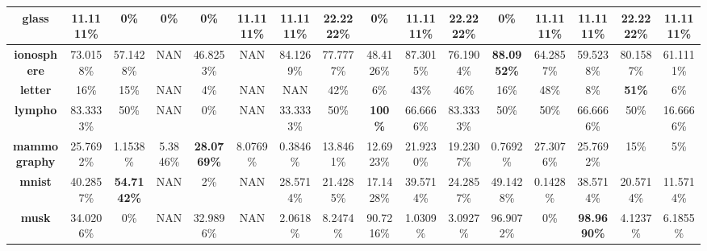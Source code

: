 \begin{table}[H]
{\begin{tabular}{|c|c|c|c|c|c|c|c|c|c|c|c|c|c|c|c|}
		\textbf{glass}            & 11.1111\%          & 0\%                & 0\%             & 0\%                & 11.1111\%     & 11.1111\%          & \textbf{22.2222\%} & 0\%                & 11.1111\%    & \textbf{22.2222\%} & 0\%                & 11.1111\%          & 11.1111\%          & \textbf{22.2222\%} & 11.1111\%    \\ \hline
		\textbf{ionosphere}       & 73.0158\%          & 57.1428\%          & NAN             & 46.8253\%          & NAN           & 84.1269\%          & 77.7777\%          & 48.4126\%          & 87.3015\%    & 76.1904\%          & \textbf{88.0952\%} & 64.2857\%          & 59.5238\%          & 80.1587\%          & 61.1111\%    \\ \hline
		\textbf{letter}           & 16\%               & 15\%               & NAN             & 4\%                & NAN           & NAN                & 42\%               & 6\%                & 43\%         & 46\%               & 16\%               & 48\%               & 8\%                & \textbf{51\%}      & 6\%          \\ \hline
		\textbf{lympho}           & 83.3333\%          & 50\%               & NAN             & 0\%                & NAN           & 33.3333\%          & 50\%               & \textbf{100\%}     & 66.6666\%    & 83.3333\%          & 50\%               & 50\%               & 66.6666\%          & 50\%               & 16.6666\%    \\ \hline
		\textbf{mammography}      & 25.7692\%          & 1.1538\%           & 5.3846\%        & \textbf{28.0769\%} & 8.0769\%      & 0.3846\%           & 13.8461\%          & 12.6923\%          & 21.9230\%    & 19.2307\%          & 0.7692\%           & 27.3076\%          & 25.7692\%          & 15\%               & 5\%          \\ \hline
		\textbf{mnist}            & 40.2857\%          & \textbf{54.7142\%} & NAN             & 2\%                & NAN           & 28.5714\%          & 21.4285\%          & 17.1428\%          & 39.5714\%    & 24.2857\%          & 49.1428\%          & 0.1428\%           & 38.5714\%          & 20.5714\%          & 11.5714\%    \\ \hline
		\textbf{musk}             & 34.0206\%          & 0\%                & NAN             & 32.9896\%          & NAN           & 2.0618\%           & 8.2474\%           & 90.7216\%          & 1.0309\%     & 3.0927\%           & 96.9072\%          & 0\%                & \textbf{98.9690\%} & 4.1237\%           & 6.1855\%     \\ \hline

\end{tabular}}
\end{table}
